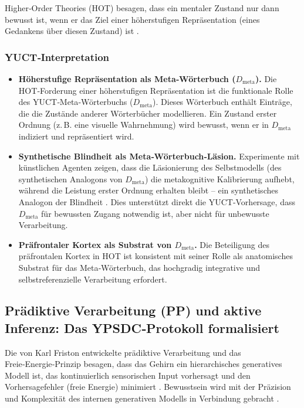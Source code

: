 \documentclass[12pt,a4paper]{article}
\begin{document}
	Higher‑Order Theories (HOT) besagen, dass ein mentaler Zustand nur dann bewusst ist, wenn er das Ziel einer höherstufigen Repräsentation (eines Gedankens über diesen Zustand) ist \cite{Rosenthal2005, Seth2022}.
	
	\subsubsection*{YUCT‑Interpretation}
	\begin{itemize}
		\item \textbf{Höherstufige Repräsentation als Meta‑Wörterbuch (\(D_{\text{meta}}\)).} Die HOT‑Forderung einer höherstufigen Repräsentation ist die funktionale Rolle des YUCT‑Meta‑Wörterbuchs (\(D_{\text{meta}}\)). Dieses Wörterbuch enthält Einträge, die die Zustände anderer Wörterbücher modellieren. Ein Zustand erster Ordnung (z. B. eine visuelle Wahrnehmung) wird bewusst, wenn er in \(D_{\text{meta}}\) indiziert und repräsentiert wird.
		\item \textbf{Synthetische Blindheit als Meta‑Wörterbuch‑Läsion.} Experimente mit künstlichen Agenten zeigen, dass die Läsionierung des Selbstmodells (des synthetischen Analogons von \(D_{\text{meta}}\)) die metakognitive Kalibrierung aufhebt, während die Leistung erster Ordnung erhalten bleibt – ein synthetisches Analogon der Blindheit \cite{Phua2026}. Dies unterstützt direkt die YUCT‑Vorhersage, dass \(D_{\text{meta}}\) für bewussten Zugang notwendig ist, aber nicht für unbewusste Verarbeitung.
		\item \textbf{Präfrontaler Kortex als Substrat von \(D_{\text{meta}}\).} Die Beteiligung des präfrontalen Kortex in HOT ist konsistent mit seiner Rolle als anatomisches Substrat für das Meta‑Wörterbuch, das hochgradig integrative und selbstreferenzielle Verarbeitung erfordert.
	\end{itemize}
	
	\subsection{Prädiktive Verarbeitung (PP) und aktive Inferenz: Das YPSDC‑Protokoll formalisiert}
	
	Die von Karl Friston entwickelte prädiktive Verarbeitung und das Freie‑Energie‑Prinzip besagen, dass das Gehirn ein hierarchisches generatives Modell ist, das kontinuierlich sensorischen Input vorhersagt und den Vorhersagefehler (freie Energie) minimiert \cite{Friston2010, Clark2016}. Bewusstsein wird mit der Präzision und Komplexität des internen generativen Modells in Verbindung gebracht \cite{Hohwy2013}.
	
\end{document}
